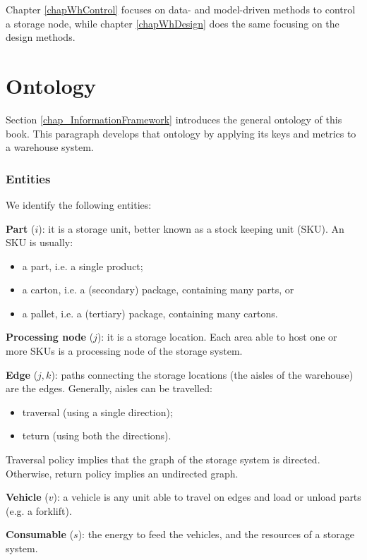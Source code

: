 Chapter \ref{chapWhControl} focuses on data- and model-driven methods to control a storage node, while chapter \ref{chapWhDesign} does the same focusing on the design methods.

\section{Ontology} \label{secOntology_wh}
Section \ref{chap_InformationFramework} introduces the general ontology of this book. This paragraph develops that ontology by applying its keys and metrics to a warehouse system.

\subsubsection{Entities}
We identify the following entities:\par
\textbf{Part} ($i$): it is a storage unit, better known as a stock keeping unit (SKU). An SKU is usually:
\begin{itemize}
    \item a part, i.e. a single product;
    \item a carton, i.e. a (secondary) package, containing many parts, or 
    \item a pallet, i.e. a (tertiary) package, containing many cartons.
\end{itemize}
\par

\textbf{Processing node} ($j$): it is a storage location. Each area able to host one or more SKUs is a processing node of the storage system. \par

\textbf{Edge} ($j,k$): paths connecting the storage locations (the aisles of the warehouse) are the edges. Generally, aisles can be travelled:
\begin{itemize}
    \item traversal (using a single direction);
    \item teturn (using both the directions).
\end{itemize}
Traversal policy implies that the graph of the storage system is directed. Otherwise, return policy implies an undirected graph.
\par

\textbf{Vehicle} ($v$): a vehicle is any unit able to travel on edges and load or unload parts (e.g. a forklift). \par

\textbf{Consumable} ($s$): the energy to feed the vehicles, and the resources of a storage system.\par

